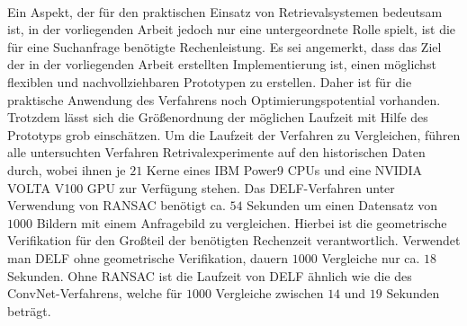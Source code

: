 \\
Ein Aspekt, der für den praktischen Einsatz von Retrievalsystemen bedeutsam ist, in der vorliegenden Arbeit jedoch nur eine untergeordnete Rolle spielt, ist die für eine Suchanfrage benötigte Rechenleistung. Es sei angemerkt, dass das Ziel der in der vorliegenden Arbeit erstellten Implementierung ist, einen möglichst flexiblen und nachvollziehbaren Prototypen zu erstellen. Daher ist für die praktische Anwendung des Verfahrens noch Optimierungspotential vorhanden. Trotzdem lässt sich die Größenordnung der möglichen Laufzeit mit Hilfe des Prototyps grob einschätzen. Um die Laufzeit der Verfahren zu Vergleichen, führen alle untersuchten Verfahren Retrivalexperimente auf den historischen Daten durch, wobei ihnen je $21$ Kerne eines IBM Power9 CPUs und eine NVIDIA VOLTA V100 GPU zur Verfügung stehen. Das DELF-Verfahren unter Verwendung von RANSAC benötigt ca. $54$ Sekunden um einen Datensatz von $1000$ Bildern mit einem Anfragebild zu vergleichen. Hierbei ist die geometrische Verifikation für den Großteil der benötigten Rechenzeit verantwortlich. Verwendet man DELF ohne geometrische Verifikation, dauern $1000$ Vergleiche nur ca. $18$ Sekunden. Ohne RANSAC ist die Laufzeit von DELF ähnlich wie die des ConvNet-Verfahrens, welche für $1000$ Vergleiche zwischen $14$ und $19$ Sekunden beträgt. 
\\
\begin{table}[h]
\caption{Erreichte mAP der unterschiedlichen Verfahren bzw. Konfigurationen auf den historischen Daten, basierend auf $42$ Anfragen; dargestellt für die einzelnen Kategorien sowie für alle Anfragen. Für die einzelnen Kategorien werden unterschiedlich viele Anfragebilder betrachtet (vgl. Tab. \ref{hist4d_data}, S. \ref{hist4d_data}).}
\label{comp_bench}
\end{table}
